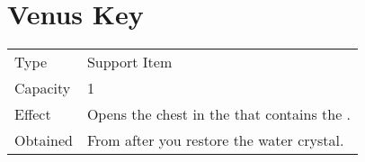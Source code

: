 \section{Venus Key}
\label{item:venus_key}


\noindent\begin{tabularx}{\textwidth}[l]{lX}
	Type
	& Support Item
\\
	Capacity
	& 1
\\
	Effect
	& Opens the chest in the \nameref{map:focus_tower} that contains the \nameref{armor:venus_shield}.
\\
	Obtained
	& From \nameref{char:spencer} after you restore the water crystal.
\end{tabularx}
